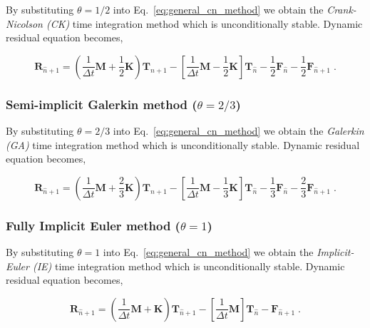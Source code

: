 \documentclass[10pt,a4paper]{article}
\begin{document}
By substituting $\theta = 1/2$ into Eq.~\eqref{eq:general_cn_method} we obtain the \textit{Crank-Nicolson (CK)} time integration method which is unconditionally stable. Dynamic residual equation becomes,

\begin{equation}
	\mathbf{R}_{\hat{n} + 1} = \left( \frac{1}{\Delta t} \mathbf{M} + \frac{1}{2} \mathbf{K} \right)\mathbf{T}_{\hat{n} + 1} - \left[ \frac{1}{\Delta t} \mathbf{M} - \frac{1}{2}\mathbf{K} \right]\mathbf{T}_{\hat{n}} - \frac{1}{2}\mathbf{F}_{\hat{n}} - \frac{1}{2}\mathbf{F}_{\hat{n} + 1} \;. 
	\label{eq:timeDeriv_crankNicolson}
\end{equation}


\subsubsection{Semi-implicit Galerkin method ($\theta = 2/3$)} \label{subsec:time_discretization_ga}

By substituting $\theta = 2/3$ into Eq.~\eqref{eq:general_cn_method} we obtain the \textit{Galerkin (GA)} time integration method which is unconditionally stable. Dynamic residual equation becomes,

\begin{equation}
	\mathbf{R}_{\hat{n} + 1} = \left( \frac{1}{\Delta t} \mathbf{M} + \frac{2}{3} \mathbf{K} \right)\mathbf{T}_{\hat{n} + 1} - \left[ \frac{1}{\Delta t} \mathbf{M} - \frac{1}{3}\mathbf{K} \right]\mathbf{T}_{\hat{n}} - \frac{1}{3}\mathbf{F}_{\hat{n}} - \frac{2}{3}\mathbf{F}_{\hat{n} + 1} \;. 
	\label{eq:timeDeriv_galerkin}
\end{equation}


\subsubsection{Fully Implicit Euler method ($\theta = 1$)} \label{subsec:time_discretization_ie}

By substituting $\theta = 1$ into Eq.~\eqref{eq:general_cn_method} we obtain the \textit{Implicit-Euler (IE)} time integration method which is unconditionally stable. Dynamic residual equation becomes,

\begin{equation}
	\mathbf{R}_{\hat{n} + 1} = \left( \frac{1}{\Delta t} \mathbf{M} + \mathbf{K} \right)\mathbf{T}_{\hat{n} + 1} - \left[ \frac{1}{\Delta t} \mathbf{M} \right]\mathbf{T}_{\hat{n}} - \mathbf{F}_{\hat{n} + 1} \;. 
	\label{eq:timeDeriv_implicitEuler}
\end{equation}
\end{document}
